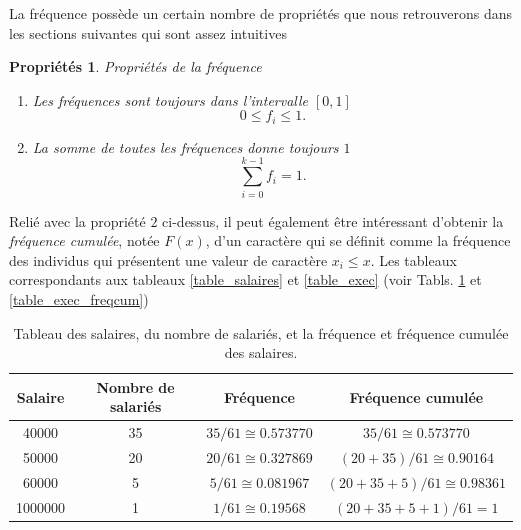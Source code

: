 \documentclass[a4paper,12pt]{book}
\newtheorem{proprietes}{Propriétés}
\begin{document}
La fréquence possède un certain nombre de propriétés que nous retrouverons 
dans les sections suivantes qui sont assez intuitives
\begin{proprietes}{Propriétés de la fréquence}
 \begin{enumerate}
  \item Les fréquences sont toujours dans l'intervalle $[0,1]$
  \begin{equation}
    0\leq f_i\leq 1.
  \end{equation}
  \item La somme de toutes les fréquences donne toujours $1$
  \begin{equation}
  \sum_{i=0}^{k-1} f_i = 1.
  \end{equation}

 \end{enumerate}

\end{proprietes}
Relié avec la propriété $2$ ci-dessus, il peut également être intéressant d'obtenir la
\textit{fréquence cumulée}, notée $F(x)$, d'un caractère qui se définit comme la fréquence des individus 
qui présentent une valeur de caractère $x_i\leq x$. Les tableaux correspondants aux tableaux 
\ref{table_salaires} et \ref{table_exec} (voir Tabls. \ref{table_salaires_freqcum} et \ref{table_exec_freqcum})
  \begin{table}[htp]
  \begin{center}
  \begin{tabular}{|c|c|c|c|}
  \hline
  Salaire & Nombre de salariés & Fréquence & Fréquence cumulée\\
  \hline\hline
  40000 & 35 & $35/61\cong0.573770$ & $35/61\cong0.573770$\\
  \hline
  50000 & 20 & $20/61\cong0.327869$ & $(20+35)/61\cong0.90164$\\
  \hline
  60000 & 5 & $5/61\cong0.081967$ & $(20+35+5)/61\cong0.98361$\\
  \hline
  1000000 & 1 & $1/61\cong0.19568$ & $(20+35+5+1)/61=1$\\
  \hline
  \end{tabular}
  \end{center}
  \caption{Tableau des salaires, du nombre de salariés, et la fréquence et fréquence cumulée des salaires.}\label{table_salaires_freqcum}
  \end{table}
  
\end{document}
